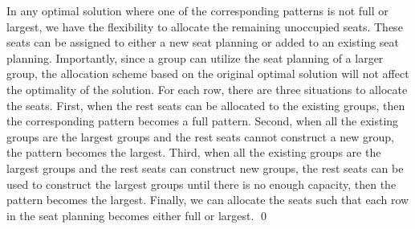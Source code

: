
  

\begin{pf}
  In any optimal solution where one of the corresponding patterns is not full or largest, we have the flexibility to allocate the remaining unoccupied seats. These seats can be assigned to either a new seat planning or added to an existing seat planning. Importantly, since a group can utilize the seat planning of a larger group, the allocation scheme based on the original optimal solution will not affect the optimality of the solution. 
  For each row, there are three situations to allocate the seats. First, when the rest seats can be allocated to the existing groups, then the corresponding pattern becomes a full pattern. Second, when all the existing groups are the largest groups and the rest seats cannot construct a new group, the pattern becomes the largest. Third, when all the existing groups are the largest groups and the rest seats can construct new groups, the rest seats can be used to construct the largest groups until there is no enough capacity, then the pattern becomes the largest. Finally, we can allocate the seats such that each row in the seat planning becomes either full or largest. \qed
  \end{pf}


